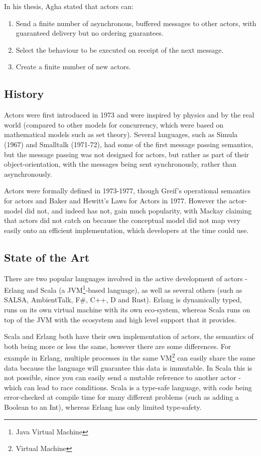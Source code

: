 \documentclass[pdftex,11pt,a4paper]{report}
\begin{document}
In his thesis, Agha\cite{agha1985} stated that actors can:
\begin{enumerate}[noitemsep]
\item Send a finite number of asynchronous, buffered messages to other actors, with guaranteed delivery but no ordering guarantees.
\item Select the behaviour to be executed on receipt of the next message.
\item Create a finite number of new actors.
\end{enumerate}

\subsection{History}

Actors were first introduced in 1973\cite{hewitt1973} and were inspired by physics and by the real world\cite{hewitt2006} (compared to other models for concurrency, which were based on mathematical models such as set theory\cite{Milner:1993:EIT:151233.151240}).
Several languages, such as Simula (1967) and Smalltalk (1971-72), had some of the first message passing semantics, but the message passing was not designed for actors, but rather as part of their object-orientation, with the messages being sent synchronously, rather than asynchronously.

Actors were formally defined in 1973-1977, though Greif's operational semantics for actors\cite{grief1975} and Baker and Hewitt's Laws for Actors in 1977\cite{hewitt1977}.
However the actor-model did not, and indeed has not, gain much popularity, with Mackay\cite{mackay97} claiming that actors did not catch on because the conceptual model did not map very easily onto an efficient implementation, which developers at the time could use.

\subsection{State of the Art}

There are two popular languages involved in the active development of actors - Erlang and Scala (a JVM\footnote{Java Virtual Machine}-based language), as well as several others (such as SALSA, AmbientTalk, F\#, C++, D and Rust).
Erlang is dynamically typed, runs on its own virtual machine with its own eco-system, whereas Scala runs on top of the JVM with the ecosystem and high level support that it provides.

Scala and Erlang both have their own implementation of actors, the semantics of both being more or less the same, however there are some differences.
For example in Erlang, multiple processes in the same VM\footnote{Virtual Machine} can easily share the same data because the language will guarantee this data is immutable.
In Scala this is not possible, since you can easily send a mutable reference to another actor - which can lead to race conditions\cite{akka-mutable}.
Scala is a type-safe language, with code being error-checked at compile time for many different problems (such as adding a Boolean to an Int), whereas Erlang has only limited type-safety.
\end{document}
